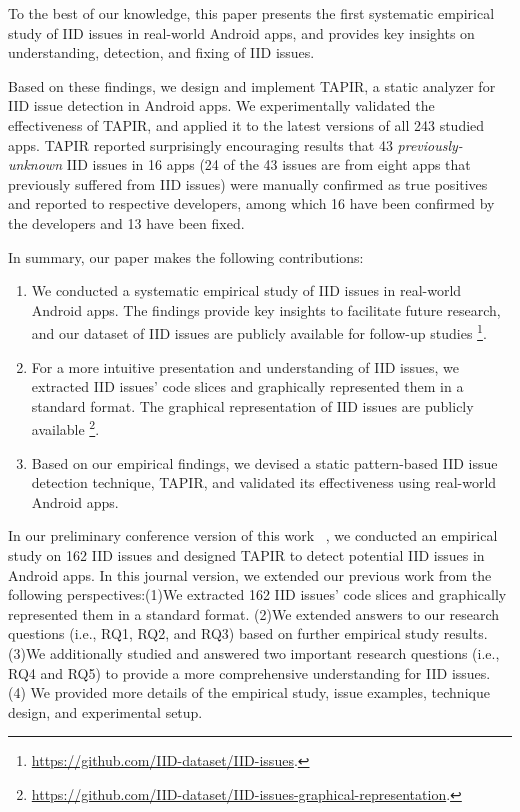 To the best of our knowledge,
this paper presents the first systematic empirical study of IID issues in real-world Android apps,
and provides key insights on understanding, detection, and fixing of IID issues. 

Based on these findings,
we design and implement TAPIR, a static analyzer for IID issue detection in Android apps.
We experimentally validated the effectiveness of TAPIR, and applied it to the latest versions of all 243 studied apps.
TAPIR reported surprisingly encouraging results that 43 \emph{previously-unknown} IID issues in 16 apps (24 of the 43 issues are from eight apps that previously suffered from IID issues) were manually confirmed as true positives and reported to respective developers,
among which 16 have been confirmed by the developers and 13 have been fixed.

In summary, our paper makes the following contributions:

\begin{enumerate}
	
  \item We conducted a systematic empirical study of IID issues in real-world Android apps. The findings provide key insights to facilitate future research, and our dataset of IID issues are publicly available for follow-up studies%
\footnote{\url{https://github.com/IID-dataset/IID-issues}.}.

  \item For a more intuitive presentation and understanding of IID issues, we extracted IID issues' code slices and graphically represented them in a standard format. The graphical representation of IID issues are publicly available%
\footnote{\url{https://github.com/IID-dataset/IID-issues-graphical-representation}.}.
  
  \item Based on our empirical findings, we devised a static pattern-based IID issue detection technique, TAPIR, and validated its effectiveness using real-world Android apps.
\end{enumerate}

In our preliminary conference version of this work~\cite{li2019characterizing} , we conducted an empirical study on 162 IID issues and designed TAPIR to detect potential IID issues in Android apps. In this journal version, we extended our previous work from the following perspectives:(1)We extracted 162 IID issues' code slices and graphically represented them in a standard format. (2)We extended answers to our research questions (i.e., RQ1, RQ2, and RQ3) based on further empirical study results. (3)We additionally studied and answered two important research questions (i.e., RQ4 and RQ5) to provide a more comprehensive understanding for IID issues. (4) We provided more details of the empirical study, issue examples, technique design, and experimental setup.

